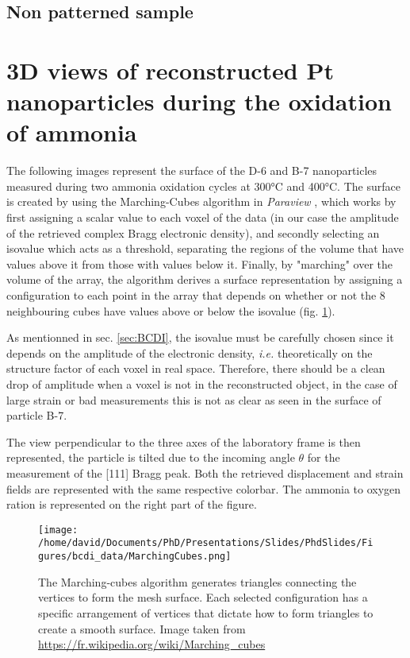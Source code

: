 \subsection{Non patterned sample} \label{sec:RGANanoparticlesPatterned}

\section{3D views of reconstructed Pt nanoparticles during the oxidation of ammonia}\label{sec:3DAmmoniaOxidation}

The following images represent the surface of the D-6 and B-7 nanoparticles measured during two ammonia oxidation cycles at 300°C and 400°C.
The surface is created by using the Marching-Cubes algorithm \parencite{Lorensen1987} in \textit{Paraview} \parencite{Ahrens2001}, which works by first assigning a scalar value to each voxel of the data (in our case the amplitude of the retrieved complex Bragg electronic density), and secondly selecting an isovalue which acts as a threshold, separating the regions of the volume that have values above it from those with values below it.
Finally, by "marching" over the volume of the array, the algorithm derives a surface representation by assigning a configuration to each point in the array that depends on whether or not the 8 neighbouring cubes have values above or below the isovalue (fig. \ref{fig:MarchingCubes}).

As mentionned in sec. \ref{sec:BCDI}, the isovalue must be carefully chosen since it depends on the amplitude of the electronic density, \textit{i.e.} theoretically on the structure factor of each voxel in real space.
Therefore, there should be a clean drop of amplitude when a voxel is not in the reconstructed object, in the case of large strain or bad measurements this is not as clear as seen in the surface of particle B-7.

The view perpendicular to the three axes of the laboratory frame is then represented, the particle is tilted due to the incoming angle $\theta$ for the measurement of the [111] Bragg peak.
Both the retrieved displacement and strain fields are represented with the same respective colorbar.
The ammonia to oxygen ration is represented on the right part of the figure.

\begin{figure}[!htb]
    \centering
    \texttt{[image: /home/david/Documents/PhD/Presentations/Slides/PhdSlides/Figures/bcdi\_data/MarchingCubes.png]}
    \caption{
    The Marching-cubes algorithm generates triangles connecting the vertices to form the mesh surface.
    Each selected configuration has a specific arrangement of vertices that dictate how to form triangles to create a smooth surface.
    Image taken from \url{https://fr.wikipedia.org/wiki/Marching_cubes}
    }
    \label{fig:MarchingCubes}
\end{figure}

\label{ref:AppendixB7}
\label{ref:AppendixD6}